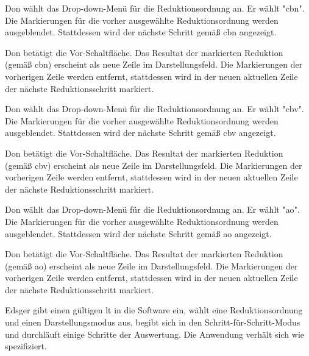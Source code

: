 \documentclass[parskip=full,11pt,twoside]{scrartcl}
\begin{document}
{Don wählt das Drop-down-Menü für die Reduktionsordnung an. Er wählt "\gls{cbn}".}
{Die Markierungen für die vorher ausgewählte Reduktionsordnung werden ausgeblendet.
Stattdessen wird der nächste Schritt gemäß \gls{cbn} angezeigt.}

{Don betätigt die Vor-Schaltfläche.}
{Das Resultat der markierten Reduktion (gemäß \gls{cbn}) erscheint als neue Zeile im Darstellungsfeld.
Die Markierungen der vorherigen Zeile werden entfernt, stattdessen wird in der neuen
aktuellen Zeile der nächste Reduktionsschritt markiert.}

{Don wählt das Drop-down-Menü für die Reduktionsordnung an. Er wählt "\gls{cbv}".}
{Die Markierungen für die vorher ausgewählte Reduktionsordnung werden ausgeblendet.
Stattdessen wird der nächste Schritt gemäß \gls{cbv} angezeigt.}

{Don betätigt die Vor-Schaltfläche.}
{Das Resultat der markierten Reduktion (gemäß \gls{cbv}) erscheint als neue Zeile im Darstellungsfeld.
Die Markierungen der vorherigen Zeile werden entfernt, stattdessen wird in der neuen
aktuellen Zeile der nächste Reduktionsschritt markiert.}

{Don wählt das Drop-down-Menü für die Reduktionsordnung an. Er wählt "\gls{ao}".}
{Die Markierungen für die vorher ausgewählte Reduktionsordnung werden ausgeblendet.
Stattdessen wird der nächste Schritt gemäß \gls{ao} angezeigt.}

{Don betätigt die Vor-Schaltfläche.}
{Das Resultat der markierten Reduktion (gemäß \gls{ao}) erscheint als neue Zeile im Darstellungsfeld.
Die Markierungen der vorherigen Zeile werden entfernt, stattdessen wird in der neuen
aktuellen Zeile der nächste Reduktionsschritt markiert.}


{Edsger gibt einen gültigen \gls{lt} in die Software ein, wählt eine Reduktionsordnung und einen
Darstellungsmodus aus, begibt sich in den Schritt-für-Schritt-Modus und durchläuft einige
Schritte der Auswertung.}
{Die Anwendung verhält sich wie spezifiziert.}
\end{document}
